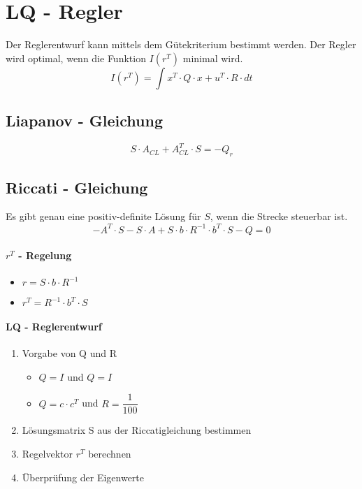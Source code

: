 



\section{LQ - Regler}
Der Reglerentwurf kann mittels dem Gütekriterium bestimmt werden. Der Regler wird optimal, wenn die Funktion $ I(r^T) $ minimal wird.
\[
I(r^T)=\int {x^T\cdot Q\cdot x+u^T\cdot R \cdot dt}
\]
\subsection{Liapanov - Gleichung}
\[
S\cdot A_{CL} + A^T_{CL}\cdot S = -Q_r
\]
\subsection{Riccati - Gleichung}
Es gibt genau eine positiv-definite Lösung für $ S $, wenn die Strecke steuerbar ist.
\[
-A^T\cdot S-S\cdot A+S\cdot b\cdot R^{-1} \cdot b^T \cdot S-Q=0	
\]
\paragraph{$ r^T $ - Regelung}	
	\begin{itemize}
		\item $ r=S\cdot b\cdot R^{-1} $
		\item $ r^T=R^{-1}\cdot b^T\cdot S $
	\end{itemize}

\paragraph{LQ - Reglerentwurf}
	\begin{enumerate}
		\item Vorgabe von Q und R
		\begin{itemize}
			\item $ Q=I $ und $ Q=I $
			\item $ Q=c\cdot c^T $ und $ R= \dfrac{1}{100} $
		\end{itemize}
		\item Lösungsmatrix S aus der Riccatigleichung bestimmen
		\item Regelvektor $ r^T $ berechnen
		\item Überprüfung der Eigenwerte
	\end{enumerate}

